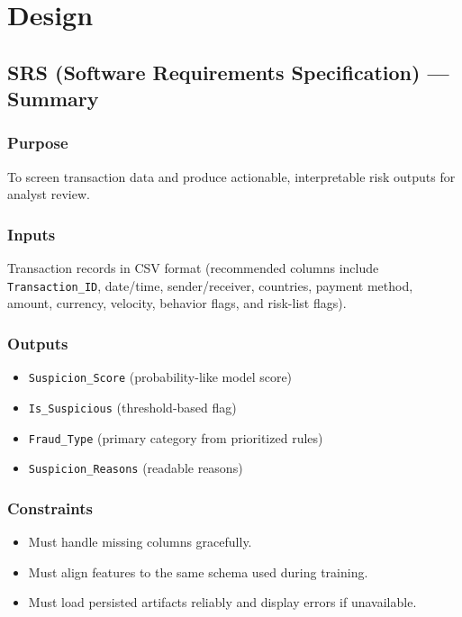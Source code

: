 \documentclass[12pt,a4paper]{report}
\begin{document}
\chapter{Design}
\section{SRS (Software Requirements Specification) --- Summary}
\subsection{Purpose}
To screen transaction data and produce actionable, interpretable risk outputs for analyst review.

\subsection{Inputs}
Transaction records in CSV format (recommended columns include \texttt{Transaction\_ID}, date/time, sender/receiver, countries, payment method, amount, currency, velocity, behavior flags, and risk-list flags).

\subsection{Outputs}
\begin{itemize}
  \item \texttt{Suspicion\_Score} (probability-like model score)
  \item \texttt{Is\_Suspicious} (threshold-based flag)
  \item \texttt{Fraud\_Type} (primary category from prioritized rules)
  \item \texttt{Suspicion\_Reasons} (readable reasons)
\end{itemize}

\subsection{Constraints}
\begin{itemize}
  \item Must handle missing columns gracefully.
  \item Must align features to the same schema used during training.
  \item Must load persisted artifacts reliably and display errors if unavailable.
\end{itemize}
\end{document}
